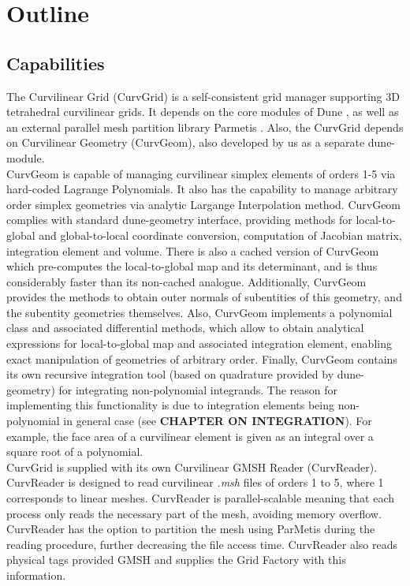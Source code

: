\section{Outline}
\label{section-outline}

\subsection{Capabilities}
\label{section-outline-capabilities}

The Curvilinear Grid (CurvGrid) is a self-consistent grid manager supporting 3D tetrahedral curvilinear grids. It depends on the core modules of Dune \citeDune{}, as well as an external parallel mesh partition library Parmetis \citeParMetis{}. Also, the CurvGrid depends on Curvilinear Geometry (CurvGeom), also developed by us as a separate dune-module. \\

\noindent
CurvGeom is capable of managing curvilinear simplex elements of orders 1-5 via hard-coded Lagrange Polynomials. It also has the capability to manage arbitrary order simplex geometries via analytic Largange Interpolation method. CurvGeom complies with standard dune-geometry interface, providing methods for local-to-global and global-to-local coordinate conversion, computation of Jacobian matrix, integration element and volume. There is also a cached version of CurvGeom which pre-computes the local-to-global map and its determinant, and is thus considerably faster than its non-cached analogue. Additionally, CurvGeom provides the methods to obtain outer normals of subentities of this geometry, and the subentity geometries themselves. Also, CurvGeom implements a polynomial class and associated differential methods, which allow to obtain analytical expressions for local-to-global map and associated integration element, enabling exact manipulation of geometries of arbitrary order. Finally, CurvGeom contains its own recursive integration tool (based on quadrature provided by dune-geometry) for integrating non-polynomial integrands. The reason for implementing this functionality is due to integration elements being non-polynomial in general case (see \textbf{CHAPTER ON INTEGRATION}). For example, the face area of a curvilinear element is given as an integral over a square root of a polynomial. \\

\noindent
CurvGrid is supplied with its own Curvilinear GMSH Reader (CurvReader). CurvReader is designed to read curvilinear \textit{.msh} files of orders 1 to 5, where 1 corresponds to linear meshes. CurvReader is parallel-scalable meaning that each process only reads the necessary part of the mesh, avoiding memory overflow. CurvReader has the option to partition the mesh using ParMetis during the reading procedure, further decreasing the file access time. CurvReader also reads physical tags provided GMSH and supplies the Grid Factory with this information. \\


